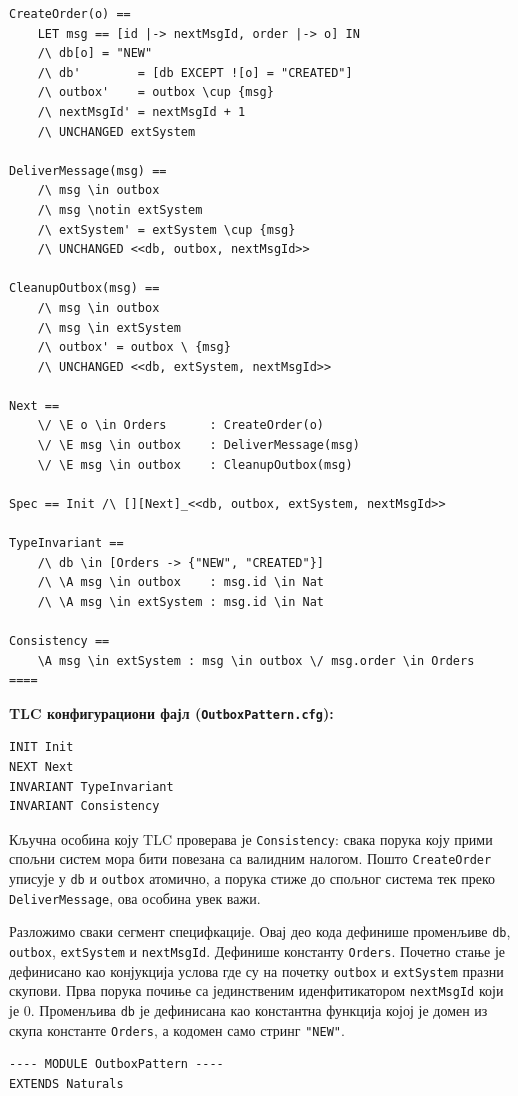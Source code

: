 \begin{primer}
\begin{lstlisting}
CreateOrder(o) ==
    LET msg == [id |-> nextMsgId, order |-> o] IN
    /\ db[o] = "NEW"
    /\ db'        = [db EXCEPT ![o] = "CREATED"]
    /\ outbox'    = outbox \cup {msg}
    /\ nextMsgId' = nextMsgId + 1
    /\ UNCHANGED extSystem

DeliverMessage(msg) ==
    /\ msg \in outbox
    /\ msg \notin extSystem
    /\ extSystem' = extSystem \cup {msg}
    /\ UNCHANGED <<db, outbox, nextMsgId>>

CleanupOutbox(msg) ==
    /\ msg \in outbox
    /\ msg \in extSystem
    /\ outbox' = outbox \ {msg}
    /\ UNCHANGED <<db, extSystem, nextMsgId>>

Next ==
    \/ \E o \in Orders      : CreateOrder(o)
    \/ \E msg \in outbox    : DeliverMessage(msg)
    \/ \E msg \in outbox    : CleanupOutbox(msg)

Spec == Init /\ [][Next]_<<db, outbox, extSystem, nextMsgId>>

TypeInvariant ==
    /\ db \in [Orders -> {"NEW", "CREATED"}]
    /\ \A msg \in outbox    : msg.id \in Nat
    /\ \A msg \in extSystem : msg.id \in Nat

Consistency ==
    \A msg \in extSystem : msg \in outbox \/ msg.order \in Orders
====
\end{lstlisting}

\textbf{TLC конфигурациони фајл (\texttt{OutboxPattern.cfg}):}
\begin{lstlisting}
INIT Init
NEXT Next
INVARIANT TypeInvariant
INVARIANT Consistency
\end{lstlisting}

Кључна особина коју TLC проверава је \texttt{Consistency}: свака порука коју прими спољни систем мора бити повезана са валидним налогом.
Пошто \texttt{CreateOrder} уписује у \texttt{db} и \texttt{outbox} атомично, а порука стиже до спољног система тек преко \texttt{DeliverMessage}, ова особина увек важи.

Разложимо сваки сегмент специфкације. Овај део кода дефинише променљиве \texttt{db}, \texttt{outbox}, \texttt{extSystem} и \texttt{nextMsgId}.
Дефинише константу \texttt{Orders}. Почетно стање је дефинисано као конјукција услова где су на почетку \texttt{outbox}
и \texttt{extSystem} празни скупови. Прва порука почиње са јединственим иденфитикатором \texttt{nextMsgId} који је 0.
Променљива \texttt{db} је дефинисана као константна функција којој је домен из скупа константе \texttt{Orders}, а кодомен
само стринг \texttt{"NEW"}.
\begin{lstlisting}
---- MODULE OutboxPattern ----
EXTENDS Naturals


\end{lstlisting}
\end{primer}

